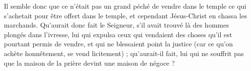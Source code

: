 Il semble donc que ce n’était pas un grand péché de vendre dans le temple ce qui s’achetait pour être offert dans le temple, et cependant Jésus-Christ en chassa les marchands. Qu’aurait donc fait le Seigneur, s’il avait trouvé là des hommes plongés dans l’ivresse, lui qui expulsa ceux qui vendaient des choses qu’il est pourtant permis de vendre, et qui ne blessaient point la justice (car ce qu’on achète honnêtement, se vend licitement) ; qu’aurait-il fait, lui qui ne souffrit pas que la maison de la prière devint une maison de négoce ?
